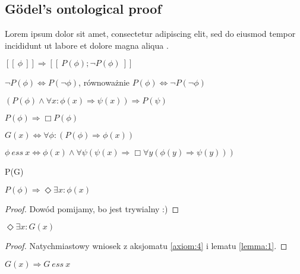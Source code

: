 \subsection{G\"odel's ontological proof}
\kant[9] Lorem ipsum dolor sit amet, consectetur adipiscing elit, sed do eiusmod tempor incididunt ut labore et dolore magna aliqua .
\begin{assumption} \label{ass:1}
    $ [\![ \ \phi \ ]\!] \Longrightarrow [\![ \ P(\phi); \neg P(\phi) \ ]\!]$
\end{assumption}
\begin{axiom}[Dualność] \label{axiom:1}
    $\neg P(\phi) \Leftrightarrow P(\neg \phi)$, równoważnie $P(\phi) \Leftrightarrow \neg P(\neg \phi)$
\end{axiom}
\begin{axiom}[Całkowitość] \label{axiom:2}
    $ \left( P(\phi) \wedge \forall x: \phi(x) \Rightarrow \psi(x) \right) \Rightarrow P(\psi) $
\end{axiom}
\begin{axiom}[Absolutność] \label{axiom:3}
    $ P(\phi) \Rightarrow \Box P(\phi) $
\end{axiom}
\begin{definition} \label{def:1}
    $ G(x) \Leftrightarrow \forall \phi: \left( P(\phi) \Rightarrow \phi(x) \right) $
\end{definition}
\begin{definition} \label{def:2}
    $ \phi \ ess \ x \Leftrightarrow \phi(x) \wedge \forall \psi \left( \psi(x) \Rightarrow \Box \forall y \left( \phi(y) \Rightarrow \psi(y) \right) \right)  $
\end{definition}
\begin{axiom} \label{axiom:4}
    P(G)
\end{axiom}
\begin{lemma} \label{lemma:1}
    $ P(\phi) \Rightarrow \Diamond \exists x : \phi(x) $
\end{lemma}
\begin{proof}
    Dowód pomijamy, bo jest trywialny :)
\end{proof}
\begin{lemma} \label{lemma:2}
    $ \Diamond \exists x : G(x) $
\end{lemma}
\begin{proof}
    Natychmiastowy wniosek z aksjomatu \ref{axiom:4} i lematu \ref{lemma:1}.
\end{proof}
\begin{lemma} \label{lemma:3}
    $ G(x) \Rightarrow G \ ess \ x $
\end{lemma}
